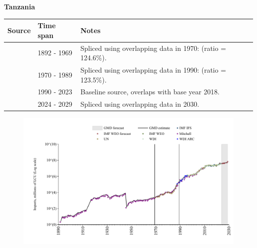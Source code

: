 \documentclass[12pt,a4paper,landscape]{article}
\begin{document}
\begin{adjustbox}{max totalsize={\paperwidth}{\paperheight},center}
\begin{minipage}[t][\textheight][t]{\textwidth}
\vspace*{0.5cm}
{}
\begin{center}
{\Large\bfseries Tanzania}
\end{center}
\vspace{0.5cm}
\begin{table}[H]
\centering
\small
\begin{tabular}{|l|l|l|}
\hline
\textbf{Source} & \textbf{Time span} & \textbf{Notes} \\
\hline
\rowcolor{white}\cite{Mitchell}& 1892 - 1969 &Spliced using overlapping data in 1970: (ratio = 124.6\%).\\
\rowcolor{lightgray}\cite{UN}& 1970 - 1989 &Spliced using overlapping data in 1990: (ratio = 123.5\%).\\
\rowcolor{white}\cite{WDI}& 1990 - 2023 &Baseline source, overlaps with base year 2018.\\
\rowcolor{lightgray}\cite{IMF_WEO_forecast}& 2024 - 2029 &Spliced using overlapping data in 2030.\\
\hline
\end{tabular}
\end{table}
\begin{figure}[H]
\centering
\includegraphics[width=\textwidth,height=0.6\textheight,keepaspectratio]{graphs/TZA_imports.pdf}
\end{figure}
\end{minipage}
\end{adjustbox}
\end{document}
